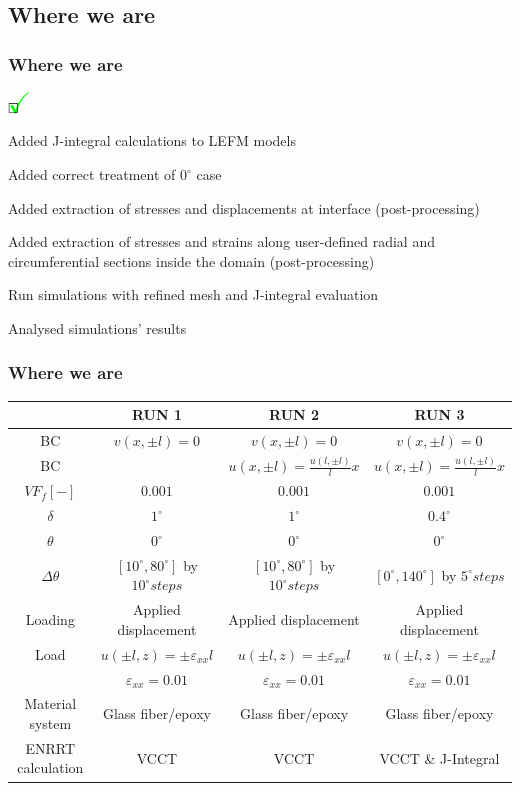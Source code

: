 \documentclass[first,firstsupp,lastsupp,handout,last,hyperref,table]{ETHclass}
\begin{document}
\subsection{Where we are}

\begin{frame}
\frametitle{Where we are}
\vspace{-0.5cm}
\begin{list}{$\text{\rlap{\textcolor{green}{\huge$\mathbf{\checkmark}$}}}\square$}{}  
\item Added J-integral calculations to LEFM models 
\item Added correct treatment of $0^{\circ}$ case
\item Added extraction of stresses and displacements at interface (post-processing)
\item Added extraction of stresses and strains along user-defined radial and circumferential sections inside the domain (post-processing)
\item Run simulations with refined mesh and J-integral evaluation
\item Analysed simulations' results
\end{list}
\end{frame}

\begin{frame}
\frametitle{Where we are}
\vspace{-0.5cm}
\tiny
\begin{table}
\begin{tabular}[!h]{cccc}
\toprule
\midrule
&RUN 1& RUN 2&RUN 3\\
\midrule
BC & $v\left(x,\pm l\right)=0$ & $v\left(x,\pm l\right)=0$&$v\left(x,\pm l\right)=0$\\[6pt]
BC &  & $u\left(x,\pm l\right)=\frac{u\left(l,\pm l\right)}{l}x$&$u\left(x,\pm l\right)=\frac{u\left(l,\pm l\right)}{l}x$\\[6pt]
$VF_{f}\left[-\right]$&$0.001$&$0.001$&$0.001$\\[6pt]
$\delta$&$1^{\circ}$&$1^{\circ}$&$0.4^{\circ}$\\[6pt]
$\theta$&$0^{\circ}$&$0^{\circ}$&$0^{\circ}$\\[6pt]
$\Delta\theta$&$\left[10^{\circ},80^{\circ}\right]$ by $10^{\circ} steps$ &$\left[10^{\circ},80^{\circ}\right]$ by $10^{\circ} steps$  &$\left[0^{\circ},140^{\circ}\right]$ by $5^{\circ} steps$ \\[6pt]
Loading&Applied displacement&Applied displacement&Applied displacement\\[6pt]
Load&$u\left(\pm l,z\right)=\pm\varepsilon_{xx} l$&$u\left(\pm l,z\right)=\pm\varepsilon_{xx} l$&$u\left(\pm l,z\right)=\pm\varepsilon_{xx} l$\\[6pt]
&$\varepsilon_{xx}=0.01$&$\varepsilon_{xx}=0.01$&$\varepsilon_{xx}=0.01$\\[6pt]
Material system&Glass fiber/epoxy&Glass fiber/epoxy&Glass fiber/epoxy\\[6pt]
ENRRT calculation&VCCT&VCCT&VCCT \& J-Integral\\
\bottomrule
\end{tabular}
\end{table}
\end{frame}
\end{document}
